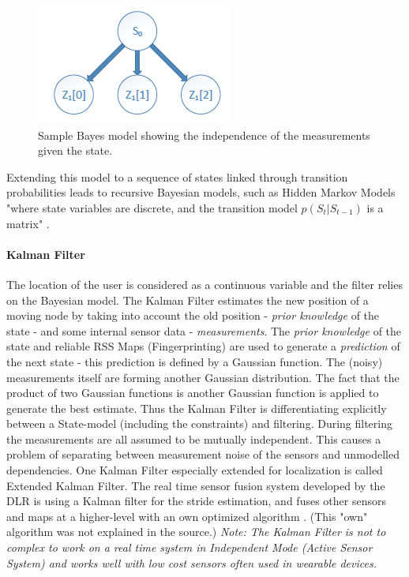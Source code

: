 \begin{figure}[h]
	\centering
		\includegraphics[width=.5\textwidth]{images/bayes.png}
	\caption{Sample Bayes model showing the independence of the measurements given the state.}
	\label{fig:bayes}
\end{figure}

Extending this model to a sequence of states linked through transition probabilities leads to recursive Bayesian models, such as Hidden Markov Models "where state variables are discrete, and the transition model $p(S_t|S_{t-1})$ is a matrix" \parencite{mapCraft}.

\paragraph{Kalman Filter} 
The location of the user is considered as a continuous variable and the filter relies on the Bayesian model. The Kalman Filter estimates the new position of a moving node by taking into account the old position - \textit{prior knowledge} of the state - and some internal sensor data - \textit{measurements}. 
The \textit{prior knowledge} of the state and reliable RSS Maps (Fingerprinting) are used to generate a \textit{prediction} of the next state - this prediction is defined by a Gaussian function. The (noisy) measurements itself are forming another Gaussian distribution. The fact that the product of two Gaussian functions is another Gaussian function is applied to generate the best estimate. Thus the Kalman Filter is differentiating explicitly between a State-model (including the constraints) and filtering. During filtering the measurements are all assumed to be mutually independent. This causes a problem of separating between measurement noise of the sensors and unmodelled dependencies. 
One Kalman Filter especially extended for localization is called Extended Kalman Filter. The real time sensor fusion system developed by the DLR is using a Kalman filter for the stride estimation, and fuses other sensors and maps at a higher-level with an own optimized algorithm \parencite{dlrFiebig}. (This "own" algorithm was not explained in the source.)
	\textit{Note: The Kalman Filter is not to complex to work on a real time system in Independent Mode (Active Sensor System) \parencite{dlrFiebig} and works well with low cost sensors often used in wearable devices.}
	
